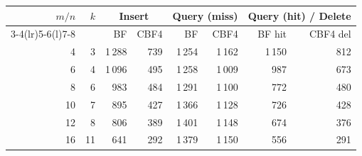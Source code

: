 \begin{tabular}{@{}rrrrrrrr@{}}
\toprule
$m/n$ & $k$ & \multicolumn{2}{c}{Insert} & \multicolumn{2}{c}{Query (miss)} & \multicolumn{2}{c}{Query (hit) / Delete}\\
\cmidrule(lr){3-4}\cmidrule(lr){5-6}\cmidrule(l){7-8}
 & & BF & CBF4 & BF & CBF4 & BF hit & CBF4 del\\
\midrule
4 & 3 & 1\,288 & 739 & 1\,254 & 1\,162 & 1\,150 & 812\\
6 & 4 & 1\,096 & 495 & 1\,258 & 1\,009 & 987 & 673\\
8 & 6 & 983 & 484 & 1\,291 & 1\,100 & 772 & 480\\
10 & 7 & 895 & 427 & 1\,366 & 1\,128 & 726 & 428\\
12 & 8 & 806 & 389 & 1\,401 & 1\,148 & 674 & 376\\
16 & 11 & 641 & 292 & 1\,379 & 1\,150 & 556 & 291\\
\bottomrule
\end{tabular}
